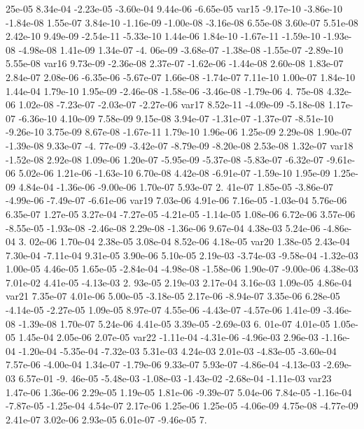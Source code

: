 25e-05  8.34e-04 -2.23e-05 -3.60e-04  9.44e-06 -6.65e-05
var15 -9.17e-10 -3.86e-10 -1.84e-08  1.55e-07  3.84e-10 -1.16e-09 -1.00e-08 -3.16e-08  6.55e-08  3.60e-07  5.51e-08  2.42e-10  9.49e-09 -2.54e-11 -5.33e-10  1.44e-06  1.84e-10 -1.67e-11 -1.59e-10 -1.93e-08 -4.98e-08  1.41e-09  1.34e-07 -4.
06e-09 -3.68e-07 -1.38e-08 -1.55e-07 -2.89e-10  5.55e-08
var16  9.73e-09 -2.36e-08  2.37e-07 -1.62e-06 -1.44e-08  2.60e-08  1.83e-07  2.84e-07  2.08e-06 -6.35e-06 -5.67e-07  1.66e-08 -1.74e-07  7.11e-10  1.00e-07  1.84e-10  1.44e-04  1.79e-10  1.95e-09 -2.46e-08 -1.58e-06 -3.46e-08 -1.79e-06  4.
75e-08  4.32e-06  1.02e-08 -7.23e-07 -2.03e-07 -2.27e-06
var17  8.52e-11 -4.09e-09 -5.18e-08  1.17e-07 -6.36e-10  4.10e-09  7.58e-09  9.15e-08  3.94e-07 -1.31e-07 -1.37e-07 -8.51e-10 -9.26e-10  3.75e-09  8.67e-08 -1.67e-11  1.79e-10  1.96e-06  1.25e-09  2.29e-08  1.90e-07 -1.39e-08  9.33e-07 -4.
77e-09 -3.42e-07 -8.79e-09 -8.20e-08  2.53e-08  1.32e-07
var18 -1.52e-08  2.92e-08  1.09e-06  1.20e-07 -5.95e-09 -5.37e-08 -5.83e-07 -6.32e-07 -9.61e-06  5.02e-06  1.21e-06 -1.63e-10  6.70e-08  4.42e-08 -6.91e-07 -1.59e-10  1.95e-09  1.25e-09  4.84e-04 -1.36e-06 -9.00e-06  1.70e-07  5.93e-07  2.
41e-07  1.85e-05 -3.86e-07 -4.99e-06 -7.49e-07 -6.61e-06
var19  7.03e-06  4.91e-06  7.16e-05 -1.03e-04  5.76e-06  6.35e-07  1.27e-05  3.27e-04 -7.27e-05 -4.21e-05 -1.14e-05  1.08e-06  6.72e-06  3.57e-06 -8.55e-05 -1.93e-08 -2.46e-08  2.29e-08 -1.36e-06  9.67e-04  4.38e-03  5.24e-06 -4.86e-04  3.
02e-06  1.70e-04  2.38e-05  3.08e-04  8.52e-06  4.18e-05
var20  1.38e-05  2.43e-04  7.30e-04 -7.11e-04  9.31e-05  3.90e-06  5.10e-05  2.19e-03 -3.74e-03 -9.58e-04 -1.32e-03  1.00e-05  4.46e-05  1.65e-05 -2.84e-04 -4.98e-08 -1.58e-06  1.90e-07 -9.00e-06  4.38e-03  7.01e-02  4.41e-05 -4.13e-03  2.
93e-05  2.19e-03  2.17e-04  3.16e-03  1.09e-05  4.86e-04
var21  7.35e-07  4.01e-06  5.00e-05 -3.18e-05  2.17e-06 -8.94e-07  3.35e-06  6.28e-05 -4.14e-05 -2.27e-05  1.09e-05  8.97e-07  4.55e-06 -4.43e-07 -4.57e-06  1.41e-09 -3.46e-08 -1.39e-08  1.70e-07  5.24e-06  4.41e-05  3.39e-05 -2.69e-03  6.
01e-07  4.01e-05  1.05e-05  1.45e-04  2.05e-06  2.07e-05
var22 -1.11e-04 -4.31e-06 -4.96e-03  2.96e-03 -1.16e-04 -1.20e-04 -5.35e-04 -7.32e-03  5.31e-03  4.24e-03  2.01e-03 -4.83e-05 -3.60e-04  7.57e-06 -4.00e-04  1.34e-07 -1.79e-06  9.33e-07  5.93e-07 -4.86e-04 -4.13e-03 -2.69e-03  6.57e-01 -9.
46e-05 -5.48e-03 -1.08e-03 -1.43e-02 -2.68e-04 -1.11e-03
var23  1.47e-06  1.36e-06  2.29e-05  1.19e-05  1.81e-06 -9.39e-07  5.04e-06  7.84e-05 -1.16e-04 -7.87e-05 -1.25e-04  4.54e-07  2.17e-06  1.25e-06  1.25e-05 -4.06e-09  4.75e-08 -4.77e-09  2.41e-07  3.02e-06  2.93e-05  6.01e-07 -9.46e-05  7.
